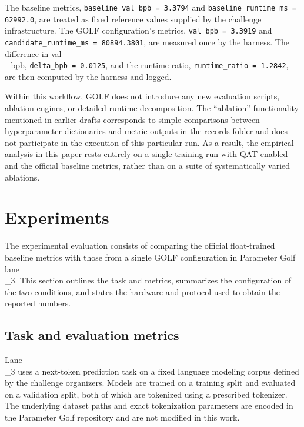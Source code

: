 \documentclass{article}
\begin{document}
The baseline metrics, \texttt{baseline\_val\_bpb = 3.3794} and \texttt{baseline\_runtime\_ms = 62992.0}, are treated as fixed reference values supplied by the challenge infrastructure. The GOLF configuration's metrics, \texttt{val\_bpb = 3.3919} and \texttt{candidate\_runtime\_ms = 80894.3801}, are measured once by the harness. The difference in val\\_bpb, \texttt{delta\_bpb = 0.0125}, and the runtime ratio, \texttt{runtime\_ratio = 1.2842}, are then computed by the harness and logged.

Within this workflow, GOLF does not introduce any new evaluation scripts, ablation engines, or detailed runtime decomposition. The ``ablation'' functionality mentioned in earlier drafts corresponds to simple comparisons between hyperparameter dictionaries and metric outputs in the records folder and does not participate in the execution of this particular run. As a result, the empirical analysis in this paper rests entirely on a single training run with QAT enabled and the official baseline metrics, rather than on a suite of systematically varied ablations.

\section{Experiments}

\label{sec:experiments}

The experimental evaluation consists of comparing the official float-trained baseline metrics with those from a single GOLF configuration in Parameter Golf lane\\_3. This section outlines the task and metrics, summarizes the configuration of the two conditions, and states the hardware and protocol used to obtain the reported numbers.

\subsection{Task and evaluation metrics}

\label{sec:task_and_evaluation_metrics}

Lane\\_3 uses a next-token prediction task on a fixed language modeling corpus defined by the challenge organizers. Models are trained on a training split and evaluated on a validation split, both of which are tokenized using a prescribed tokenizer. The underlying dataset paths and exact tokenization parameters are encoded in the Parameter Golf repository and are not modified in this work.
\end{document}
